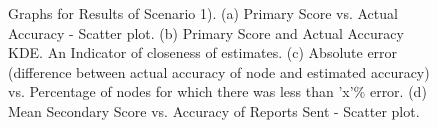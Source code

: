 \documentclass[journal]{IEEEtran}
\begin{document}
\begin{figure}[!ht]
{	}
\end{figure}
\begin{figure}[!ht]
	\caption{Graphs for Results of Scenario 1). (a) Primary Score vs. Actual Accuracy - Scatter plot. (b) Primary Score and Actual Accuracy KDE. An Indicator of closeness of estimates. (c) Absolute error (difference between actual accuracy of node and estimated accuracy) vs. Percentage of nodes for which there was less than 'x'\% error. (d) Mean Secondary Score vs. Accuracy of Reports Sent - Scatter plot.}
	\label{fig:apdx:sc1}
	\centering
\end{figure}
\end{document}
